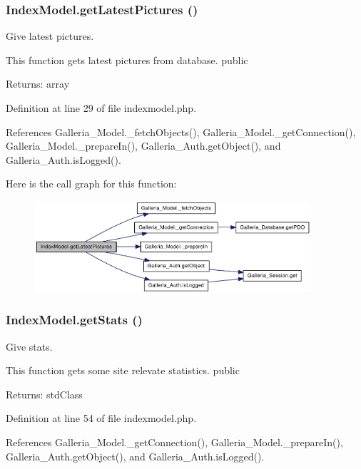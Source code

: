 \subsubsection{\setlength{\rightskip}{0pt plus 5cm}IndexModel.getLatestPictures ()}\label{classIndexModel_f26b8c0fb120d50602c24fe1a1817292}


Give latest pictures.

This function gets latest pictures from database.  public \begin{Desc}
\item[Returns:]array \end{Desc}


Definition at line 29 of file indexmodel.php.

References Galleria\_\-Model.\_\-fetchObjects(), Galleria\_\-Model.\_\-getConnection(), Galleria\_\-Model.\_\-prepareIn(), Galleria\_\-Auth.getObject(), and Galleria\_\-Auth.isLogged().

Here is the call graph for this function:\nopagebreak
\begin{figure}[H]
\begin{center}
\leavevmode
\includegraphics[width=291pt]{classIndexModel_f26b8c0fb120d50602c24fe1a1817292_cgraph}
\end{center}
\end{figure}
\subsubsection{\setlength{\rightskip}{0pt plus 5cm}IndexModel.getStats ()}\label{classIndexModel_663be11207a8ff64aa0bbb268ad015b1}


Give stats.

This function gets some site relevate statistics.  public \begin{Desc}
\item[Returns:]stdClass \end{Desc}


Definition at line 54 of file indexmodel.php.

References Galleria\_\-Model.\_\-getConnection(), Galleria\_\-Model.\_\-prepareIn(), Galleria\_\-Auth.getObject(), and Galleria\_\-Auth.isLogged().

